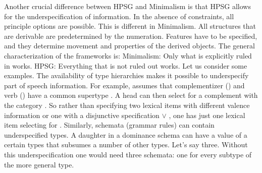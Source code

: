 \documentclass[output=paper
                ,modfonts
                ,nonflat
	        ,collection
	        ,collectionchapter
	        ,collectiontoclongg
 	        ,biblatex
                ,babelshorthands
                ,newtxmath
                ,draftmode
                ,colorlinks, citecolor=brown
]{./langsci/langscibook}
\begin{document}
Another crucial difference between HPSG and Minimalism is that HPSG allows for the underspecification of
information. In the absence of constraints, all principle options are possible. This is different in
Minimalism. All structures that are derivable are predetermined by the numeration. Features have to
be specified, and they determine movement and properties of the derived objects. The general
characterization of the frameworks is: 
\eal
\ex Minimalism: Only what is explicitly ruled in works. 
\ex HPSG: Everything that is not ruled out works.
\zl
Let us consider some examples. 
The availability of type hierarchies makes it possible to underspecify part of speech
information. For example, \citet{Sag97a} assumes that complementizer () and verb
() have a common supertype . A head can then select for a complement with the category . So rather
than specifying two lexical items with different valence information or one with a disjunctive
specification  $\vee$ , one has just one lexical item selecting for
. Similarly, schemata (grammar rules) can contain underspecified types. A daughter in a
dominance schema can have a value of a certain types that subsumes a number of other
types. Let's say three. Without this underspecification one would need three schemata: one for every
subtype of the more general type.
\end{document}
